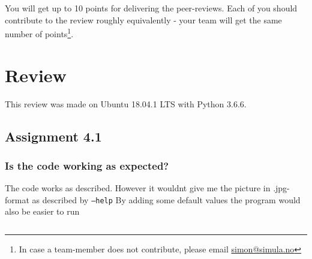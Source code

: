 \documentclass[a4paper]{article}
\begin{document}
You will get up to 10 points for delivering the peer-reviews. Each of you should contribute to the review roughly equivalently - your team will get the same number of points\footnote{In case a team-member does not contribute, please email \href{mailto:simon@simula.no}{simon@simula.no}}. 


%
%





\section{Review}\label{sec:review}


This review was made on Ubuntu 18.04.1 LTS with Python 3.6.6.


\subsection*{Assignment 4.1}

\subsubsection*{Is the code working as expected?}

The code works as described. However it wouldnt give me the picture in .jpg-format as described by \texttt{--help}
By adding some default values the program would also be easier to run
\begin{verbatim}
\end{verbatim}
\end{document}
